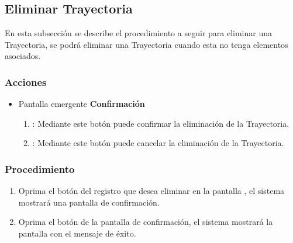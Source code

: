\subsection{Eliminar Trayectoria}

En esta subsección se describe el procedimiento a seguir para eliminar una Trayectoria, se podrá eliminar una Trayectoria cuando esta no tenga elementos asociados.


\subsubsection{Acciones}
\begin{itemize}
  \item Pantalla emergente \textbf{Confirmación}
  \begin{enumerate}
	\item {}: Mediante este botón puede confirmar la eliminación de la Trayectoria.
	\item {}: Mediante este botón puede cancelar la eliminación de la Trayectoria.
  \end{enumerate}
\end{itemize}


\subsubsection{Procedimiento}
\begin{enumerate}
	\item Oprima el botón \btnEliminar del registro que desea eliminar en la pantalla , el sistema mostrará una pantalla de confirmación.
	
	\item Oprima el botón  de la pantalla de confirmación, el sistema mostrará la pantalla  con el mensaje de éxito.
\end{enumerate}

